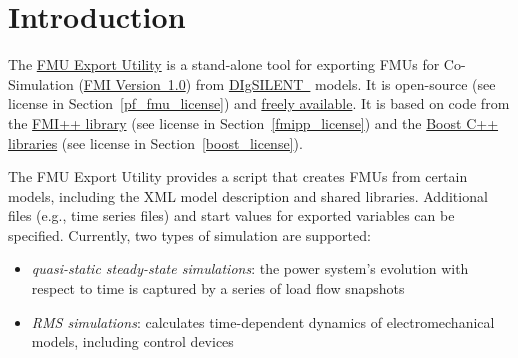 
\chapter{Introduction}


The \href{http://powerfactory-fmu.sourceforge.net}{\fmipp \pf FMU Export Utility} is a stand-alone tool for exporting FMUs for Co-Simulation (\href{https://www.fmi-standard.org/}{FMI Version~1.0}) from \href{http://www.digsilent.com/}{DIgSILENT~\pf} models. It is open-source (see license in Section~\ref{pf_fmu_license}) and \href{http://powerfactory-fmu.sourceforge.net}{freely available}. It is based on code from the \href{http://fmipp.sourceforge.net}{FMI++ library} (see license in Section~\ref{fmipp_license}) and the \href{http://www.boost.org/}{Boost C++ libraries} (see license in Section~\ref{boost_license}).

The \fmipp \pf FMU Export Utility provides a \href{https://www.python.org/}{\python} script that creates FMUs from certain \pf models, including the XML model description and shared libraries. Additional files (e.g., time series files) and start values for exported variables can be specified. Currently, two types of simulation are supported:
\begin{itemize}
  \item \emph{quasi-static steady-state simulations}: the power system's evolution with respect to time is captured by a series of load flow snapshots
  \item \emph{RMS simulations}: calculates time-dependent dynamics of electromechanical models, including control devices
\end{itemize}
